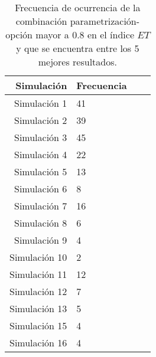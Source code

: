 \begin{table}
    \centering
    \caption{Frecuencia de ocurrencia de la combinación parametrización-opción mayor a 0.8 en el índice $ET$ y que se encuentra entre los 5 mejores resultados.}
    \label{tabla:resultado_tiempo}
\begin{tabular}{rlrr}
\toprule
 Simulación &  Frecuencia \\
\midrule
Simulación 1  &     41 \\
Simulación 2  &     39 \\
Simulación 3  &     45 \\
Simulación 4  &     22 \\
Simulación 5  &     13 \\
Simulación 6  &      8 \\
Simulación 7  &     16 \\
Simulación 8  &      6 \\
Simulación 9  &      4 \\
Simulación 10 &      2 \\
Simulación 11 &     12 \\
Simulación 12 &      7 \\
Simulación 13 &      5 \\
Simulación 15 &      4 \\
Simulación 16 &      4 \\

\bottomrule
\end{tabular}
\end{table}

